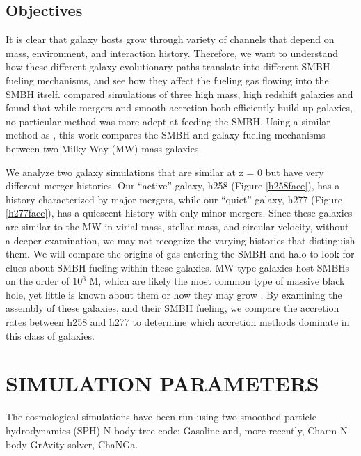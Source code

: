 \documentclass[12pt,headA,chapB]{fiskthesis}
\begin{document}
\section{Objectives}
It is clear that galaxy hosts grow through variety of channels that depend on mass, environment, and interaction history. Therefore, we want to understand how these different galaxy evolutionary paths translate into different SMBH fueling mechanisms, and see how they affect the fueling gas flowing into the SMBH itself. \cite{Bellovary2013} compared simulations of three high mass, high redshift galaxies and found that while mergers and smooth accretion both efficiently build up galaxies, no particular method was more adept at feeding the SMBH. Using a similar method as \cite{Bellovary2013}, this work compares the SMBH and galaxy fueling mechanisms between two Milky Way (MW) mass galaxies. 
	
We analyze two galaxy simulations that are similar at z = 0 but have very different merger histories. Our ``active'' galaxy, h258 (Figure \ref{h258face}), has a history characterized by major mergers, while our ``quiet'' galaxy, h277 (Figure \ref{h277face}), has a quiescent history with only minor mergers. Since these galaxies are similar to the MW in virial mass, stellar mass, and circular velocity, without a deeper examination, we may not recognize the varying histories that distinguish them. We will compare the origins of gas entering the SMBH and halo to look for clues about SMBH fueling within these galaxies. MW-type galaxies host SMBHs on the order of 10$^6$ M, which are likely the most common type of massive black hole, yet little is known about them or how they may grow \citep{Kormendy2013}.  By examining the assembly of these galaxies, and their SMBH fueling, we compare the accretion rates between h258 and h277 to determine which accretion methods dominate in this class of galaxies.


\chapter{\normalsize SIMULATION PARAMETERS}
\thispagestyle{empty}

The cosmological simulations have been run using two smoothed particle hydrodynamics (SPH) N-body tree code: Gasoline \citep[][Stadel 2001, how do I cite a PhD thesis?]{Wadsley2004} and, more recently, Charm N-body GrAvity solver, ChaNGa. 
\end{document}
